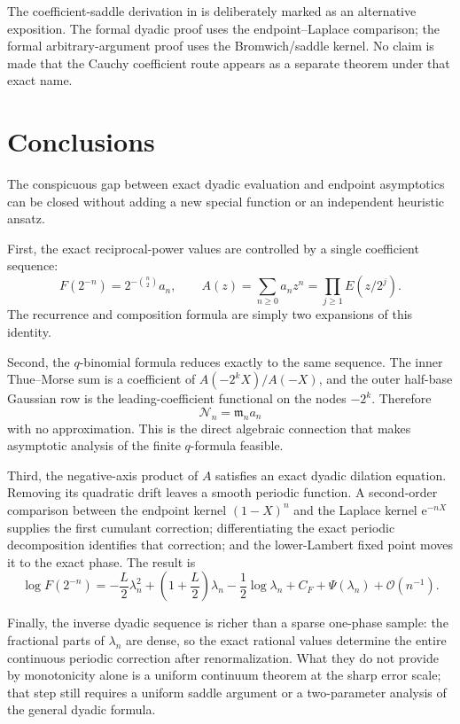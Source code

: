 \documentclass[11pt,oneside]{article}
\theoremstyle{definition}
\theoremstyle{remark}
\newcommand{\e}{\mathrm e}
\newcommand{\bigO}{\mathcal O}
\newcommand{\M}{\mathfrak m}
\begin{document}
The coefficient-saddle derivation in  is deliberately marked as
an alternative exposition.  The formal dyadic proof uses the endpoint--Laplace comparison;
the formal arbitrary-argument proof uses the Bromwich/saddle kernel.  No claim is made that
the Cauchy coefficient route appears as a separate theorem under that exact name.

\section{Conclusions}
\label{sec:conclusion}

The conspicuous gap between exact dyadic evaluation and endpoint asymptotics can be closed
without adding a new special function or an independent heuristic ansatz.

First, the exact reciprocal-power values are controlled by a single coefficient sequence:
\begin{equation*}
 F(2^{-n})=2^{-\binom n2}a_n,
 \qquad
 A(z)=\sum_{n\ge0}a_nz^n=\prod_{j\ge1}E(z/2^j).
\end{equation*}
The recurrence and composition formula are simply two expansions of this identity.

Second, the $q$-binomial formula reduces exactly to the same sequence.  The inner Thue--Morse
sum is a coefficient of $A(-2^kX)/A(-X)$, and the outer half-base Gaussian row is the
leading-coefficient functional on the nodes $-2^k$.  Therefore
\begin{equation*}
 \mathcal N_n=\M_na_n
\end{equation*}
with no approximation.  This is the direct algebraic connection that makes asymptotic
analysis of the finite $q$-formula feasible.

Third, the negative-axis product of $A$ satisfies an exact dyadic dilation equation.  Removing
its quadratic drift leaves a smooth periodic function.  A second-order comparison between the
endpoint kernel $(1-X)^n$ and the Laplace kernel $\e^{-nX}$ supplies the first cumulant
correction; differentiating the exact periodic decomposition identifies that correction; and
the lower-Lambert fixed point moves it to the exact phase.  The result is
\begin{equation*}
 \log F(2^{-n})=
 -\frac L2\lambda_n^2+
 \left(1+\frac L2\right)\lambda_n-\frac12\log\lambda_n
 +C_F+\Psi(\lambda_n)+\bigO(n^{-1}).
\end{equation*}

Finally, the inverse dyadic sequence is richer than a sparse one-phase sample: the fractional
parts of $\lambda_n$ are dense, so the exact rational values determine the entire continuous
periodic correction after renormalization.  What they do not provide by monotonicity alone is
a uniform continuum theorem at the sharp error scale; that step still requires a uniform
saddle argument or a two-parameter analysis of the general dyadic formula.
\end{document}
